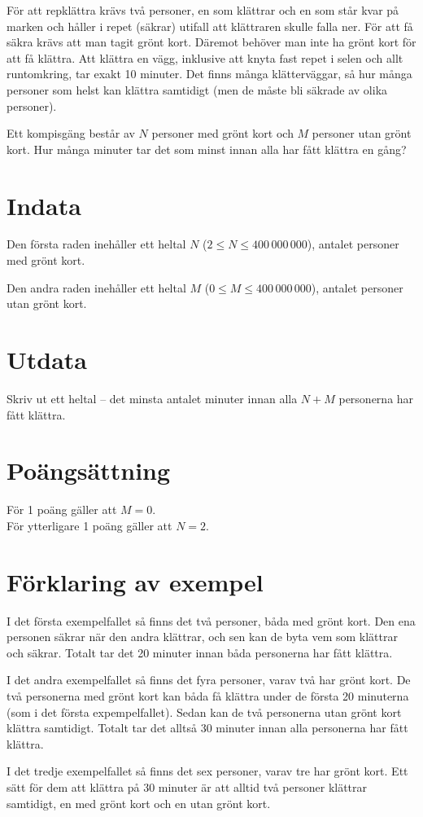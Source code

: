 

För att repklättra krävs två personer, en som klättrar och en som står kvar på marken och håller i repet (säkrar) utifall att klättraren skulle falla ner. För att få säkra krävs att man tagit grönt kort. Däremot behöver man inte ha grönt kort för att få klättra. Att klättra en vägg, inklusive att knyta fast repet i selen och allt runtomkring, tar exakt 10 minuter. Det finns många klätterväggar, så hur många personer som helst kan klättra samtidigt (men de måste bli säkrade av olika personer).

Ett kompisgäng består av $N$ personer med grönt kort och $M$ personer utan grönt kort. Hur många minuter tar det som minst innan alla har fått klättra en gång?

\section*{Indata}
Den första raden inehåller ett heltal $N$ ($2 \le N \le 400\,000\,000$), antalet personer med grönt kort.

Den andra raden inehåller ett heltal $M$ ($0 \le M \le 400\,000\,000$), antalet personer utan grönt kort.


\section*{Utdata}
Skriv ut ett heltal -- det minsta antalet minuter innan alla $N+M$ personerna har fått klättra.

\section*{Poängsättning}
För 1 poäng gäller att $M = 0$. \\
För ytterligare 1 poäng gäller att $N = 2$.

\section*{Förklaring av exempel}
I det första exempelfallet så finns det två personer, båda med grönt kort.
Den ena personen säkrar när den andra klättrar, och sen kan de byta vem som klättrar och säkrar. Totalt tar det 20 minuter innan båda personerna har fått klättra.

I det andra exempelfallet så finns det fyra personer, varav två har grönt kort.
De två personerna med grönt kort kan båda få klättra under de första 20 minuterna (som i
det första expempelfallet). Sedan kan de två personerna utan grönt kort klättra samtidigt.
Totalt tar det alltså 30 minuter innan alla personerna har fått klättra.

I det tredje exempelfallet så finns det sex personer, varav tre har grönt kort.
Ett sätt för dem att klättra på 30 minuter är att alltid två personer klättrar samtidigt, en med grönt kort och en utan grönt kort.
